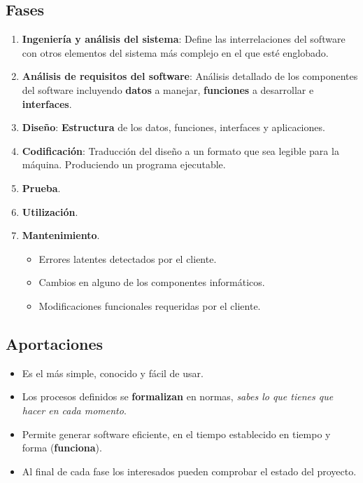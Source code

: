 \subsection{Fases}
 \begin{enumerate}
 
     \item \textbf{Ingeniería y análisis del sistema}: Define las interrelaciones del software con otros elementos del sistema más complejo en el que esté englobado.
     
     \item \textbf{Análisis de requisitos del software}: Análisis detallado de los componentes del software incluyendo \textbf{datos} a manejar, \textbf{funciones} a desarrollar e \textbf{interfaces}.
     
     \item \textbf{Diseño}: \textbf{Estructura} de los datos, funciones, interfaces y aplicaciones.
     
     \item \textbf{Codificación}: Traducción del diseño a un formato que sea legible para la máquina. Produciendo un programa ejecutable.
     
     
     \item \textbf{Prueba}.
     
     \item \textbf{Utilización}.
     \item \textbf{Mantenimiento}.
     
     \begin{itemize}
         \item Errores latentes detectados por el cliente.
         \item Cambios en alguno de los componentes informáticos.
         \item Modificaciones funcionales requeridas por el cliente.
     \end{itemize}
 \end{enumerate}
 
 \subsection{Aportaciones}
 \begin{itemize}
    \item Es el más simple, conocido y fácil de usar.
    \item Los procesos definidos se \textbf{formalizan} en normas, \textit{sabes lo que tienes que hacer en cada momento}.
    \item Permite generar software eficiente, en el tiempo establecido en tiempo y forma (\textbf{funciona}).
    \item Al final de cada fase los interesados pueden comprobar el estado del proyecto.
 \end{itemize}
 

